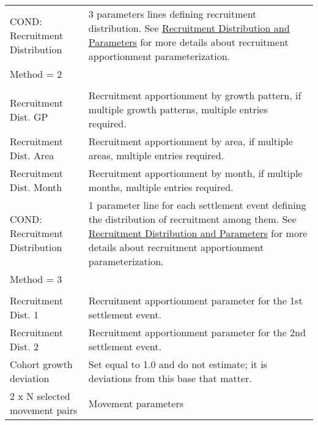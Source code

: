 \begin{longtable}{p{1cm} p{2.25cm} p{10cm}}
	\multicolumn{2}{l}{COND: Recruitment Distribution } \Tstrut & 3 parameters lines defining recruitment distribution. See \hyperlink{recdist}{Recruitment Distribution and Parameters} for more details about recruitment apportionment parameterization. \\
	\multicolumn{2}{l}{ Method = 2 } \Tstrut & \\
	& & \\
	\multicolumn{2}{l}{Recruitment Dist. GP} \Tstrut & Recruitment apportionment by growth pattern, if multiple growth patterns, multiple entries required.\\
	\multicolumn{2}{l}{Recruitment Dist. Area} & Recruitment apportionment by area, if multiple areas, multiple entries required.\\
	\multicolumn{2}{l}{Recruitment Dist. Month} & Recruitment apportionment by month, if multiple months, multiple entries required.\Bstrut\\
	\hline

	\multicolumn{2}{l}{COND: Recruitment Distribution } \Tstrut & 1 parameter line for each settlement event defining the distribution of recruitment among them. See \hyperlink{recdist}{Recruitment Distribution and Parameters} for more details about recruitment apportionment parameterization. \\
	\multicolumn{2}{l}{ Method = 3 } \Tstrut & \\
	& & \\
	\multicolumn{2}{l}{Recruitment Dist. 1} \Tstrut & Recruitment apportionment parameter for the 1st settlement event.\\
	\multicolumn{2}{l}{Recruitment Dist. 2} & Recruitment apportionment parameter for the 2nd settlement event.\Bstrut\\
	\hline
	

	\multicolumn{2}{l}{Cohort growth deviation} \Tstrut & Set equal to 1.0 and do not estimate; it is deviations from this base that matter.\Bstrut\\
	\hline

	\multicolumn{2}{l}{2 x N selected movement pairs} & Movement parameters\Tstrut\Bstrut\\
	\hline


\end{longtable}
